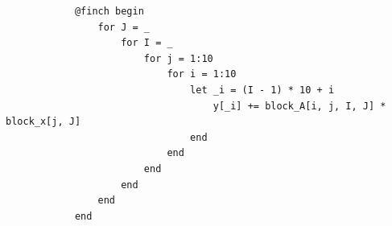 
\begin{verbatim}
            @finch begin
                for J = _
                    for I = _
                        for j = 1:10
                            for i = 1:10
                                let _i = (I - 1) * 10 + i
                                    y[_i] += block_A[i, j, I, J] * block_x[j, J]
                                end
                            end
                        end
                    end
                end
            end
\end{verbatim}


